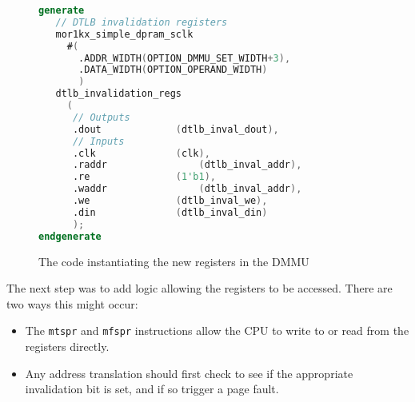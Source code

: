 \begin{figure}[t]
  \centering
  \begin{lstlisting}[language=Verilog]
generate
   // DTLB invalidation registers
   mor1kx_simple_dpram_sclk
     #(
       .ADDR_WIDTH(OPTION_DMMU_SET_WIDTH+3),
       .DATA_WIDTH(OPTION_OPERAND_WIDTH)
       )
   dtlb_invalidation_regs
     (
      // Outputs
      .dout				(dtlb_inval_dout),
      // Inputs
      .clk				(clk),
      .raddr				(dtlb_inval_addr),
      .re				(1'b1),
      .waddr				(dtlb_inval_addr),
      .we				(dtlb_inval_we),
      .din				(dtlb_inval_din)
      );
endgenerate
  \end{lstlisting}
  \caption{The code instantiating the new registers in the DMMU}
  \label{fig:regs_inst}
\end{figure}

The next step was to add logic allowing the registers to be accessed. There are two ways this might occur:
\begin{itemize}
	\item The \texttt{mtspr} and \texttt{mfspr} instructions allow the CPU to write to or read from the registers directly.
	\item Any address translation should first check to see if the appropriate invalidation bit is set, and if so trigger a page fault.
\end{itemize}

